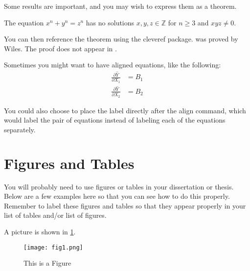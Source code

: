 Some results are important, and you may wish to express them as a theorem.

\begin{theorem}\label{theorem 1}  The equation $x^n+y^n=z^n$ has no solutions $x,y,z\in \mathbb Z$ for $n\geq 3$ and $xyz\neq 0$.
\end{theorem}

You can then reference the theorem using the \textsf{cleveref} package.  was proved by Wiles.  The proof does not appear in \citet{kopka2004guide}.

Sometimes you might want to have aligned equations, like the following:
\begin{align} %
	\frac{\partial\hat{Y}}{\partial X_1} &= B_1 \label{eq:Equation2} \\
	\frac{\partial\hat{Y}}{\partial X_2} &= B_2 \label{eq:Equation3}
\end{align}

You could also choose to place the label directly after the align command, which would label the pair of equations instead of labeling each of the equations separately. 

\section{Figures and Tables}

You will probably need to use figures or tables in your dissertation or thesis. Below are a few examples here so that you can see how to do this properly. Remember to label these figures and tables so that they appear properly in your list of tables and/or list of figures.



A picture is shown in  \cref{fig:fig1}.
\begin{figure}[h]
	\centering
{}
\label{fig:fig1}
\caption{This is a Figure}
{\mbox{\texttt{[image: fig1.png]}}}
\end{figure}

